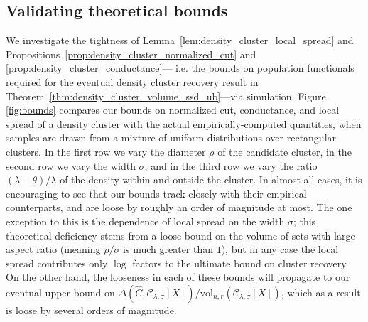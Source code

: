\documentclass[11pt,twoside]{article}
\newcommand{\1}{\mathbf{1}}
\newcommand{\mc}[1]{\mathcal{#1}}
\newcommand{\wh}[1]{\widehat{#1}}
\newcommand{\vol}{\mathrm{vol}}
\begin{document}
\subsection{Validating theoretical bounds}
We investigate the tightness of Lemma~\ref{lem:density_cluster_local_spread} and Propositions~\ref{prop:density_cluster_normalized_cut} and \ref{prop:density_cluster_conductance}--- i.e. the bounds on population functionals required for the eventual density cluster recovery result in Theorem~\ref{thm:density_cluster_volume_ssd_ub}---via simulation. Figure \ref{fig:bounds} compares our bounds on normalized cut, conductance, and local spread of a density cluster with the actual empirically-computed quantities, when samples are drawn from a mixture of uniform distributions over rectangular clusters. In the first row we vary the diameter $\rho$ of the candidate cluster, in the second row we vary the width $\sigma$, and in the third row we vary the ratio $(\lambda - \theta)/\lambda$ of the density within and outside the cluster. In almost all cases, it is encouraging to see that our bounds track closely with their empirical counterparts, and are loose by roughly an order of magnitude at most. The one exception to this is the dependence of local spread on the width $\sigma$; this theoretical deficiency stems from a loose bound on the volume of sets with large aspect ratio (meaning $\rho/\sigma$ is much greater than $1$), but in any case the local spread contributes only $\log$ factors to the ultimate bound on cluster recovery. On the other hand, the looseness in each of these bounds will propagate to our eventual upper bound on $\Delta(\wh{C},\mc{C}_{\lambda,\sigma}[X])/\vol_{n,r}(\mc{C}_{\lambda,\sigma}[X])$, which as a result is loose by several orders of magnitude. 
\end{document}
